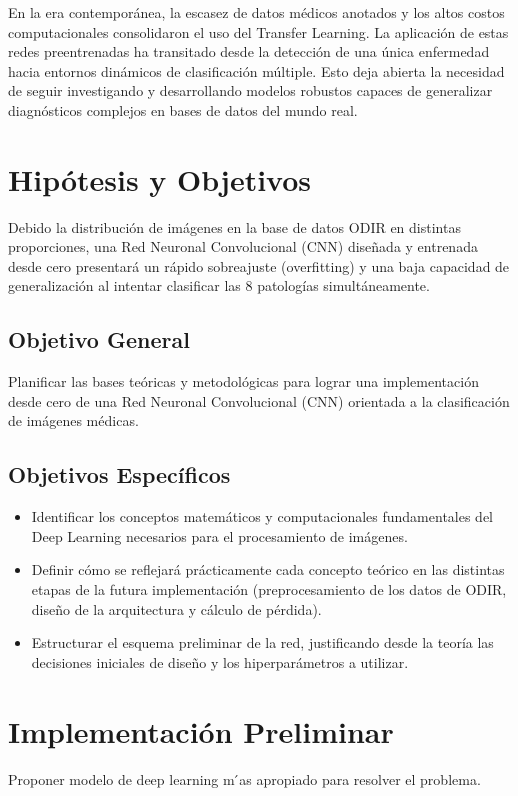 \documentclass[12pt, a4paper]{article}
\begin{document}
En la era contemporánea, la escasez de datos médicos anotados y los altos costos computacionales consolidaron el uso del Transfer Learning. La aplicación de estas redes preentrenadas ha transitado desde la detección de una única enfermedad hacia entornos dinámicos de clasificación múltiple. Esto deja abierta la necesidad de seguir investigando y desarrollando modelos robustos capaces de generalizar diagnósticos complejos en bases de datos del mundo real.




\newpage
\section{Hipótesis y Objetivos}

Debido la distribución de imágenes en la base de datos ODIR en distintas proporciones, una Red Neuronal Convolucional (CNN) diseñada y entrenada desde cero presentará un rápido sobreajuste (overfitting) y una baja capacidad de generalización al intentar clasificar las 8 patologías simultáneamente.

\subsection{Objetivo General}
Planificar las bases teóricas y metodológicas para lograr una implementación desde cero de una Red Neuronal Convolucional (CNN) orientada a la clasificación de imágenes médicas.
\subsection{Objetivos Específicos}
\begin{itemize}
    \item Identificar los conceptos matemáticos y computacionales fundamentales del Deep Learning necesarios para el procesamiento de imágenes.
    \item Definir cómo se reflejará prácticamente cada concepto teórico en las distintas etapas de la futura implementación (preprocesamiento de los datos de ODIR, diseño de la arquitectura y cálculo de pérdida).
    \item Estructurar el esquema preliminar de la red, justificando desde la teoría las decisiones iniciales de diseño y los hiperparámetros a utilizar.
\end{itemize}

\section{Implementación Preliminar}
Proponer modelo de deep learning m ́as apropiado para resolver el problema.
\end{document}
